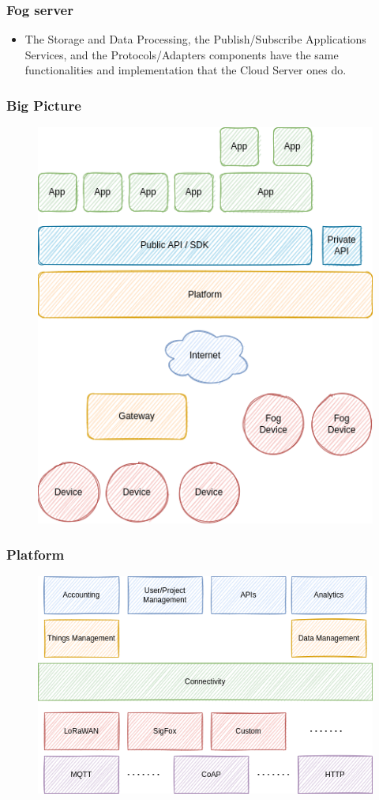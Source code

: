 \documentclass{../iot-lecture}
\begin{document}
\begin{frame}
  \frametitle{Fog server}
  \begin{itemize}
    \item The Storage and Data Processing, the Publish/Subscribe Applications Services, and the Protocols/Adapters components have the
      same functionalities and implementation that the Cloud Server ones do.
  \end{itemize}
\end{frame}

\begin{frame}
  \frametitle{Big Picture}
  \begin{figure}
    \includegraphics[height=.8\textheight]{./img/big-picture.png}
  \end{figure}
\end{frame}

\begin{frame}
  \frametitle{Platform}
  \begin{figure}
    \includegraphics[width=\textwidth]{./img/platform.png}
  \end{figure}
\end{frame}
\end{document}
